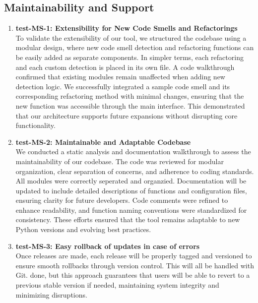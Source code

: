 \documentclass[12pt, titlepage]{article}
\begin{document}
\subsection{Maintainability and Support}
\begin{enumerate}

  \item \textbf{test-MS-1: Extensibility for New Code Smells and
    Refactorings} \\[2mm]
    To validate the extensibility of our tool, we structured the
    codebase using a modular design, where new code smell detection
    and refactoring functions can
    be easily added as separate components. In simpler terms, each
    refactoring and each custom detection is placed in its own file.
    A code walkthrough confirmed that
    existing modules remain unaffected when adding new detection
    logic. We successfully integrated a sample code smell and its
    corresponding refactoring method with
    minimal changes, ensuring that the new function was accessible
    through the main interface. This demonstrated that our
    architecture supports future expansions without
    disrupting core functionality.

  \item \textbf{test-MS-2: Maintainable and Adaptable Codebase} \\[2mm]
    We conducted a static analysis and documentation walkthrough to
    assess the maintainability of our codebase. The code was reviewed
    for modular organization, clear separation
    of concerns, and adherence to coding standards. All modules were
    correctly seperated and organzied. Documentation will be updated
    to include detailed descriptions of functions
    and configuration files, ensuring clarity for future developers.
    Code comments were refined to enhance readability, and function
    naming conventions were standardized for
    consistency. These efforts ensured that the tool remains
    adaptable to new Python versions and evolving best practices.

  \item \textbf{test-MS-3: Easy rollback of updates in case of errors} \\[2mm]
    Once releases are made, each release will be properly tagged and
    versioned to ensure smooth rollbacks through version control.
    This will all be handled with Git. done, but
    this approach guarantees that users will be able to revert to a
    previous stable version if needed, maintaining system integrity
    and minimizing disruptions.
\end{enumerate}
\end{document}

